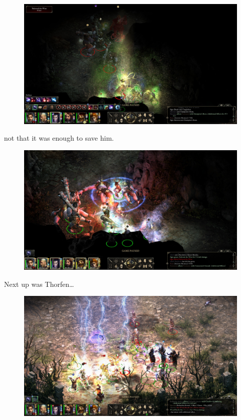 \documentclass{article}
\begin{document}
\begin{figure}
\includegraphics[scale=0.33]{files/blog/2019_03_04_pillars_of_eternity_path_of_the_damned_act_iii/2019_03_04_nalrend1.jpg}
\end{figure}

not that it was enough to save him.

\begin{figure}
\includegraphics[scale=0.33]{files/blog/2019_03_04_pillars_of_eternity_path_of_the_damned_act_iii/2019_03_04_nalrend2.jpg}
\end{figure}

Next up was Thorfen\ldots

\begin{figure}
\includegraphics[scale=0.33]{files/blog/2019_03_04_pillars_of_eternity_path_of_the_damned_act_iii/2019_03_04_thorfen1.jpg}
\end{figure}
\end{document}
